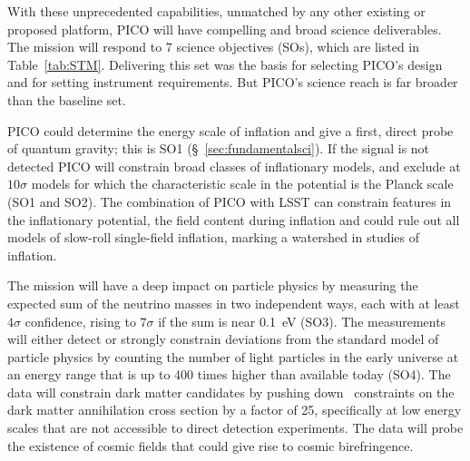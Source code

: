 \documentclass[PICOReport.tex]{subfiles}
\begin{document}
With these unprecedented capabilities, unmatched by any other existing or proposed platform, PICO will have compelling and broad science deliverables. The mission will respond to 7 science objectives (SOs), which are listed in Table~\ref{tab:STM}. Delivering this set was the basis for selecting PICO's design and for setting instrument requirements. But PICO's science reach is far broader than the baseline set. 

PICO could determine the energy scale of inflation and give a first, direct probe of quantum gravity; this is SO1 (\S~\ref{sec:fundamentalsci}). If the signal is not detected PICO will constrain broad classes of inflationary models, and exclude at $10\sigma$ models for which the characteristic scale in the potential is the Planck scale (SO1 and SO2). The combination of PICO with LSST can constrain features in the inflationary potential, the field content during inflation and could rule out all models of slow-roll single-field inflation, marking a watershed in studies of inflation. 

The mission will have a deep impact on particle physics by measuring the expected sum of the neutrino masses in two independent ways, each with at least $4\sigma$ confidence, rising to $7\sigma$ if the sum is near 0.1~eV (SO3).  The measurements will either detect or strongly constrain deviations from the standard model of particle physics by counting the number of light particles in the early universe at an energy range that is up to 400 times higher than available today  (SO4). The data will constrain dark matter candidates by pushing down \planck\ constraints on the dark matter annihilation cross section by a factor of 25, specifically at low energy scales that are not accessible to direct detection experiments. The data will probe the existence of cosmic fields that could give rise to cosmic birefringence. 
\end{document}

